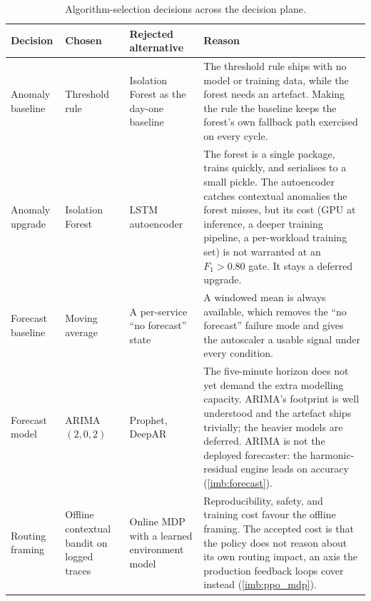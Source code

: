 \begin{table}[H]
  \centering
  \caption[Algorithm-selection decisions across the decision plane]{Algorithm-selection decisions across the decision plane.}
  \label{tab:imb:algo_choices}
  \small
  \begin{tabularx}{\linewidth}{@{}p{2.5cm}p{2.9cm}p{2.7cm}Y@{}}
    \toprule
    \headrow
    \textbf{Decision} & \textbf{Chosen} & \textbf{Rejected alternative} & \textbf{Reason} \\
    \midrule
    Anomaly baseline & Threshold rule & Isolation Forest as the day-one baseline
      & The threshold rule ships with no model or training data, while the forest
        needs an artefact. Making the rule the baseline keeps the forest's own
        fallback path exercised on every cycle. \\
    \addlinespace
    Anomaly upgrade & Isolation Forest & LSTM autoencoder
      & The forest is a single package, trains quickly, and serialises to a small
        pickle. The autoencoder catches contextual anomalies the forest misses,
        but its cost (GPU at inference, a deeper training pipeline, a per-workload
        training set) is not warranted at an $F_1>0.80$ gate. It stays a deferred
        upgrade. \\
    \addlinespace
    Forecast baseline & Moving average & A per-service ``no forecast'' state
      & A windowed mean is always available, which removes the
        ``no forecast'' failure mode and gives the autoscaler a usable signal
        under every condition. \\
    \addlinespace
    Forecast model & ARIMA$(2,0,2)$ & Prophet, DeepAR
      & The five-minute horizon does not yet demand the extra modelling capacity.
        ARIMA's footprint is well understood and the artefact ships trivially;
        the heavier models are deferred. ARIMA is not the deployed forecaster:
        the harmonic-residual engine leads on accuracy (\cref{imb:forecast}). \\
    \addlinespace
    Routing framing & Offline contextual bandit on logged traces & Online MDP with a learned environment model
      & Reproducibility, safety, and training cost favour the offline framing. The
        accepted cost is that the policy does not reason about its own routing
        impact, an axis the production feedback loops cover instead
        (\cref{imb:ppo_mdp}). \\
    \bottomrule
  \end{tabularx}
\end{table}

